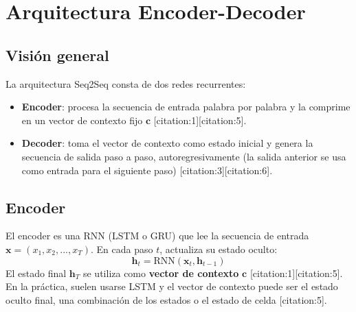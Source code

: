 \documentclass[12pt,a4paper,openany,oneside]{book}
\begin{document}
\section{Arquitectura Encoder-Decoder}

\subsection{Visión general}
La arquitectura Seq2Seq consta de dos redes recurrentes:
\begin{itemize}
    \item \textbf{Encoder}: procesa la secuencia de entrada palabra por palabra y la comprime en un vector de contexto fijo \(\mathbf{c}\) [citation:1][citation:5].
    \item \textbf{Decoder}: toma el vector de contexto como estado inicial y genera la secuencia de salida paso a paso, autoregresivamente (la salida anterior se usa como entrada para el siguiente paso) [citation:3][citation:6].
\end{itemize}

\begin{center}
\caption{Arquitectura Seq2Seq básica. El encoder comprime la secuencia en \(\mathbf{c}\); el decoder genera la salida a partir de \(\mathbf{c}\).}
\end{center}

\subsection{Encoder}
El encoder es una RNN (LSTM o GRU) que lee la secuencia de entrada \(\mathbf{x} = (x_1, x_2, ..., x_T)\). En cada paso \(t\), actualiza su estado oculto:
\[
\mathbf{h}_t = \text{RNN}(\mathbf{x}_t, \mathbf{h}_{t-1})
\]
El estado final \(\mathbf{h}_T\) se utiliza como \textbf{vector de contexto} \(\mathbf{c}\) [citation:1][citation:5]. En la práctica, suelen usarse LSTM y el vector de contexto puede ser el estado oculto final, una combinación de los estados o el estado de celda [citation:5].
\end{document}
